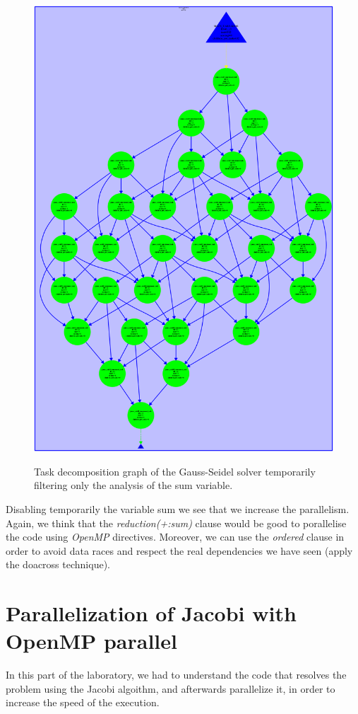 \documentclass[12pt, a4paper]{article}
\begin{document}
\begin{figure}[H]
	\centering
	\includegraphics[scale=0.20]{./images/tareador-gauss-seidel-2b-sum}
	\label{fig:TDGGauss-Seidel-disable-sum}
	\caption{Task decomposition graph of the Gauss-Seidel solver temporarily filtering only the analysis of the sum variable.}
\end{figure}

Disabling temporarily the variable sum we see that we increase the parallelism. Again, we think that the \textit{reduction(+:sum)} clause would be good to porallelise the code using \textit{OpenMP} directives. Moreover, we can use the \textit{ordered} clause in order to avoid data races and respect the real dependencies we have seen (apply the doacross technique).


\section{Parallelization of Jacobi with OpenMP parallel}
In this part of the laboratory, we had to understand the code that resolves the problem using the Jacobi algoithm, and afterwards parallelize it, in order to increase the speed of the execution.
\end{document}
